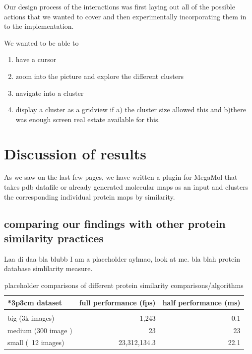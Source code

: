 \documentclass[journal]{vgtc}       %
\begin{document}
Our design process of the interactions was first  laying out all of the possible actions that we wanted to cover and then experimentally incorporating them in to the implementation.

We wanted to be able to 
\begin{enumerate}
  \item have a cursor 
  \item zoom into the picture and  explore the different clusters
  \item navigate into a cluster
  \item display a cluster as a gridview if a) the cluster size allowed this and b)there was enough screen real estate available for this.
  
\end{enumerate}



\section{Discussion of results}
As we saw on the last few pages, we have written a plugin for MegaMol that takes pdb datafile or already generated molecular maps as an input and clusters  the corresponding individual protein maps by similarity.

\subsection{comparing our findings with other protein similarity practices}\label{subsec:comparison}
Laa di daa bla blubb I am a placeholder aylmao, look at me. bla \cite{3dsurfer} blah protein database simlilarity measure.


\begin{table}
  \caption{
  \label{tab:perf} placeholder comparisons of different protein similarity comparisons/algorithms}
  \centering
  \vspace{0.3em}
  \begin{tabular}{lrr}{*{3}{p{3cm}}}
  dataset & full performance (fps) & half performance (ms)\\ \hline\\[-0.4em]
  big (3k images) & 1,243 & 0.1 \\
  medium (300 image ) & 23 & 23 \\
  small (~12 images) & 23,312,134.3 & 22.1 \\
  \end{tabular}
  \end{table}
\end{document}
